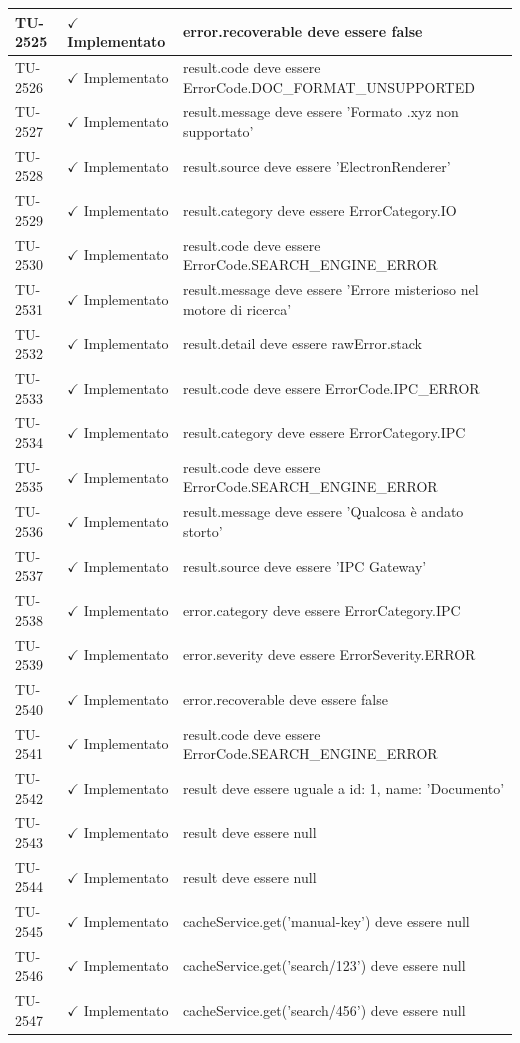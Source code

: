 ﻿\documentclass[a4paper,12pt]{article}
\newcommand{\ok}{\textcolor{green!60!black}{$\checkmark$ Implementato}}
\begin{document}
\begin{longtable}{|p{2cm}|p{3.5cm}|p{9.5cm}|}
\hline
TU-2525 & \ok & error.recoverable deve essere false \\
\hline
TU-2526 & \ok & result.code deve essere ErrorCode.DOC\_FORMAT\_UNSUPPORTED \\
\hline
TU-2527 & \ok & result.message deve essere 'Formato .xyz non supportato' \\
\hline
TU-2528 & \ok & result.source deve essere 'ElectronRenderer' \\
\hline
TU-2529 & \ok & result.category deve essere ErrorCategory.IO \\
\hline
TU-2530 & \ok & result.code deve essere ErrorCode.SEARCH\_ENGINE\_ERROR \\
\hline
TU-2531 & \ok & result.message deve essere 'Errore misterioso nel motore di ricerca' \\
\hline
TU-2532 & \ok & result.detail deve essere rawError.stack \\
\hline
TU-2533 & \ok & result.code deve essere ErrorCode.IPC\_ERROR \\
\hline
TU-2534 & \ok & result.category deve essere ErrorCategory.IPC \\
\hline
TU-2535 & \ok & result.code deve essere ErrorCode.SEARCH\_ENGINE\_ERROR \\
\hline
TU-2536 & \ok & result.message deve essere 'Qualcosa è andato storto' \\
\hline
TU-2537 & \ok & result.source deve essere 'IPC Gateway' \\
\hline
TU-2538 & \ok & error.category deve essere ErrorCategory.IPC \\
\hline
TU-2539 & \ok & error.severity deve essere ErrorSeverity.ERROR \\
\hline
TU-2540 & \ok & error.recoverable deve essere false \\
\hline
TU-2541 & \ok & result.code deve essere ErrorCode.SEARCH\_ENGINE\_ERROR \\
\hline
TU-2542 & \ok & result deve essere uguale a { id: 1, name: 'Documento' } \\
\hline
TU-2543 & \ok & result deve essere null \\
\hline
TU-2544 & \ok & result deve essere null \\
\hline
TU-2545 & \ok & cacheService.get('manual-key') deve essere null \\
\hline
TU-2546 & \ok & cacheService.get('search/123') deve essere null \\
\hline
TU-2547 & \ok & cacheService.get('search/456') deve essere null \\

\end{longtable}
\end{document}
